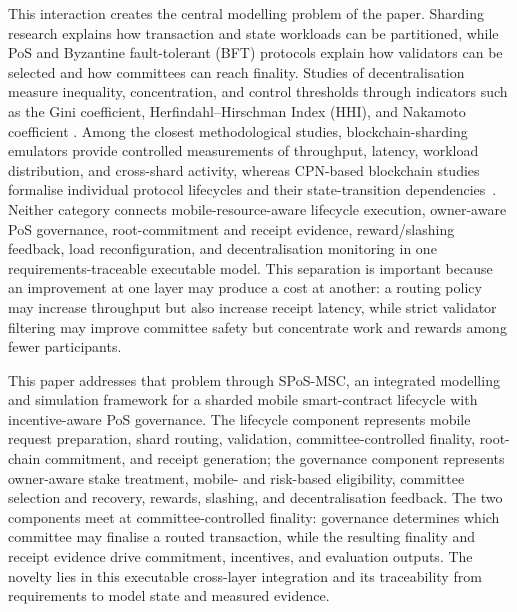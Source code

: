 \documentclass[a4paper,fleqn]{cas-sc}
\begin{document}
This interaction creates the central modelling problem of the paper.
Sharding research explains how transaction and state workloads can be
partitioned, while PoS and Byzantine fault-tolerant (BFT) protocols explain how validators can be selected and how committees can reach finality. Studies of decentralisation measure inequality, concentration, and control thresholds through indicators such as the Gini coefficient, Herfindahl--Hirschman Index (HHI), and Nakamoto coefficient
\cite{MENG2023Gini,motepalli2025pos,nakai2024}.
Among the closest methodological studies, blockchain-sharding emulators provide controlled measurements of throughput, latency, workload distribution, and cross-shard activity, whereas CPN-based blockchain studies formalise individual protocol lifecycles and their state-transition dependencies~\cite{Huang2025BlockEmulator,Sujatanagarjuna2021BlockVoke}. Neither category connects mobile-resource-aware lifecycle execution, owner-aware PoS governance, root-commitment and receipt evidence, reward/slashing feedback, load reconfiguration, and decentralisation monitoring in one requirements-traceable executable model. This separation is important because an improvement at one layer may produce a cost at another: a routing policy may increase throughput but also increase receipt latency, while strict validator filtering may improve committee safety but concentrate work and rewards among fewer participants.

This paper addresses that problem through SPoS-MSC, an integrated modelling and simulation framework for a sharded mobile smart-contract lifecycle with incentive-aware PoS governance. The lifecycle component represents mobile request preparation, shard routing, validation, committee-controlled finality, root-chain commitment, and receipt generation; the governance component represents owner-aware stake treatment, mobile- and risk-based eligibility, committee selection and recovery, rewards, slashing, and decentralisation feedback. The two components meet at committee-controlled
finality: governance determines which committee may finalise a routed
transaction, while the resulting finality and receipt evidence drive
commitment, incentives, and evaluation outputs. The novelty lies in this executable cross-layer integration and its traceability from requirements to model state and measured evidence.
\end{document}
